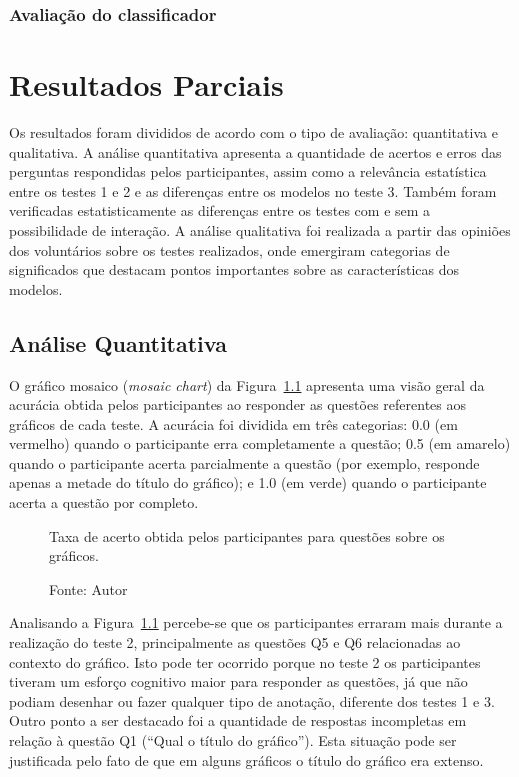 \documentclass[
	12pt,				%
	openright,			%
	oneside,			%
	a4paper,			%
	english,			%
	brazil				%
	]{abntex2}
\begin{document}
\subsection{Avaliação do classificador}

\chapter{Resultados Parciais}

Os resultados foram divididos de acordo com o tipo de avaliação: quantitativa e qualitativa. A análise quantitativa apresenta a quantidade de acertos e erros das perguntas respondidas pelos participantes, assim como a relevância estatística entre os testes 1 e 2 e as diferenças entre os modelos no teste 3. Também foram verificadas estatisticamente as diferenças entre os testes com e sem a possibilidade de interação. A análise qualitativa foi realizada a partir das opiniões dos voluntários sobre os testes realizados, onde emergiram categorias de significados que destacam pontos importantes sobre as características dos modelos.

\section{Análise Quantitativa}

O gráfico mosaico (\textit{mosaic chart}) da Figura~\ref{fig:mosaic} apresenta uma visão geral da acurácia obtida pelos participantes ao responder as questões referentes aos gráficos de cada teste. A acurácia foi dividida em três categorias: 0.0 (em vermelho) quando o participante erra completamente a questão; 0.5 (em amarelo) quando o participante acerta parcialmente a questão (por exemplo, responde apenas a metade do título do gráfico); e 1.0 (em verde) quando o participante acerta a questão por completo.

\begin{figure}[!h]
\caption{Taxa de acerto obtida pelos participantes para questões sobre os gráficos.}
\caption*{Fonte: Autor}
\label{fig:mosaic}
\end{figure}

Analisando a Figura~\ref{fig:mosaic} percebe-se que os participantes erraram mais durante a realização do teste 2, principalmente as questões Q5 e Q6 relacionadas ao contexto do gráfico. Isto pode ter ocorrido porque no teste 2 os participantes tiveram um esforço cognitivo maior para responder as questões, já que não podiam desenhar ou fazer qualquer tipo de anotação, diferente dos testes 1 e 3. Outro ponto a ser destacado foi a quantidade de respostas incompletas em relação à questão Q1 (``Qual o título do gráfico'').  Esta situação pode ser justificada pelo fato de que em alguns gráficos o título do gráfico era extenso.
\end{document}
